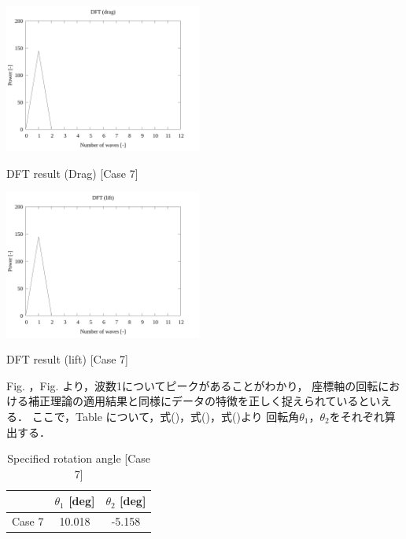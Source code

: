 \begin{multicols}{2}
    \begin{figure_here}
        \begin{center}
        \includegraphics[width=65mm]{../../02_workspace/result/simulation_tx=10.0_ty=-5.0_dx=5.00_dy=-2.50/plot/07/07-3_dft-drag.png}
        \caption{DFT result (Drag) [Case 7]}
        \includegraphics[width=65mm]{../../02_workspace/result/simulation_tx=10.0_ty=-5.0_dx=5.00_dy=-2.50/plot/07/07-4_dft-lift.png}
        \caption{DFT result (lift) [Case 7]}
        \end{center}
    \end{figure_here}
\end{multicols}

Fig. ，Fig. より，波数1についてピークがあることがわかり，
座標軸の回転における補正理論の適用結果と同様にデータの特徴を正しく捉えられているといえる．
ここで，Table について，式()，式()，式()より
回転角$\theta_1$，$\theta_2$をそれぞれ算出する．

\begin{table}[htbp]
    \begin{center}
        \caption{Specified rotation angle [Case 7]}
        \begin{tabular}{|p{30mm}|p{20mm}|p{20mm}|}
            \hline
            \multicolumn{1}{|c|}{}       & \multicolumn{1}{|c|}{$\theta_1$ [deg]}   & \multicolumn{1}{|c|}{$\theta_2$ [deg]} \\ \hline
            \multicolumn{1}{|c|}{Case 7} & \multicolumn{1}{|c|}{10.018}     & \multicolumn{1}{|c|}{-5.158}         \\ \hline
        \end{tabular}
    \end{center}
\end{table}


